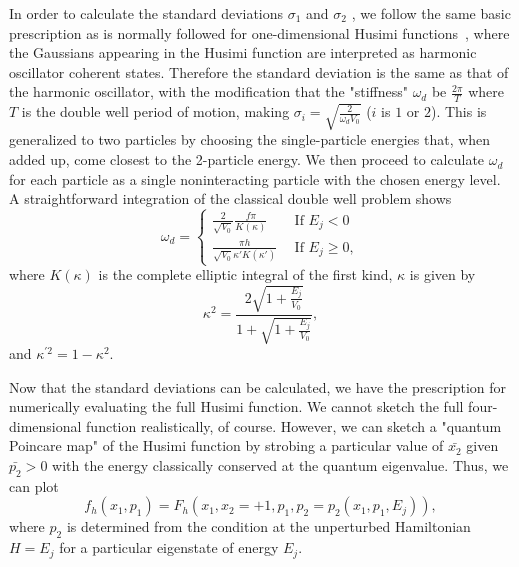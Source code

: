 \documentclass{article}
\begin{document}
In order to calculate the standard deviations ${\sigma}_1$ and $\sigma_2$ , we follow the same basic prescription as is normally followed for one-dimensional Husimi functions~\cite{novaes}, where the Gaussians appearing in the Husimi function are  interpreted as harmonic oscillator coherent states. Therefore the standard deviation is the same as that of the harmonic oscillator, with the modification that the "stiffness" $\omega_d$ be $\frac{2\pi}{T}$ where $T$ is the double well period of motion, making $\sigma_i=\sqrt{\frac{2}{\omega_d V_0}}$ ($i$ is $1$ or $2$). This is generalized to two particles by choosing the single-particle energies that, when added up, come closest to the 2-particle energy.
We then proceed to calculate $\omega_d$ for each particle as a single noninteracting particle with the chosen energy level. A straightforward integration of the classical double well problem shows~\cite{reichl-appendix}
%
\begin{equation}
\omega_d =
\begin{cases}
\frac{2}{\sqrt{V_0}}\frac{f\pi}{K(\kappa)}& ~~\text{If $E_j<0$} \\
\frac{\pi h}{\sqrt{V_0}\kappa'K(\kappa')}& ~~\text{If $E_j\geq 0$},
\end{cases}
\end{equation}
%
where  $K(\kappa)$  is the complete elliptic integral of the first kind, $\kappa$ is given by
%
\begin{equation}
\kappa^2=\frac{2\sqrt{1+\frac{E_j}{V_0}}}{1+\sqrt{1+\frac{E_j}{V_0}}},
\end{equation}
%
and ${\kappa}^{'2}=1-{\kappa}^2$. 

Now that the standard deviations can be calculated, we have the prescription for numerically evaluating the full Husimi function. We cannot sketch the full four- dimensional function realistically, of course. However, we can sketch a "quantum Poincare map" of the Husimi function by strobing a particular value of $\bar{x_2}$ given $\bar{p_2} > 0$ with  the energy  classically conserved at the quantum eigenvalue. Thus, we can plot
%
\begin{equation}
f_h(x_1,p_1) = F_h (x_1, x_2 = +1, p_1, 
 p_2=p_2(x_1,p_1,E_j)),
\label{eq:husimi_section}
\end{equation}
%
where $p_2$ is determined from the condition at the unperturbed Hamiltonian  $H= E_j$ for a particular eigenstate of energy $E_j$.
\end{document}

